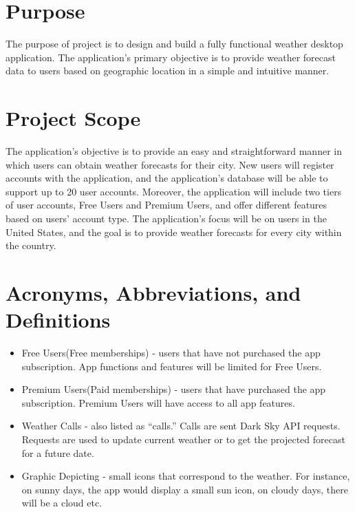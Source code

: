 \documentclass{scrreprt}
\begin{document}
\section{Purpose}
The purpose of project is to design and build a fully functional weather desktop application. The application’s primary objective is to provide weather forecast data to users based on geographic location in a simple and intuitive manner. 

\section{Project Scope}
The application’s objective is to provide an easy and straightforward manner in which users can obtain weather forecasts for their city. New users will register accounts with the application, and the application’s database will be able to support up to 20 user accounts.  Moreover, the application will include two tiers of user accounts, Free Users and Premium Users, and offer different features based on users’ account type. The application’s focus will be on users in the United States, and the goal is to provide weather forecasts for every city within the country.					
					
\section{Acronyms, Abbreviations, and Definitions}
\begin{itemize}

\item Free Users(Free memberships) - users that have not purchased the app subscription. App functions and features will be limited for Free Users.

\item Premium Users(Paid memberships) - users that have purchased the app subscription. Premium Users will have access to all app features. 

\item Weather Calls - also listed as “calls.” Calls are sent Dark Sky API requests. Requests are used to update current weather or to get the projected forecast for a future date.

\item Graphic Depicting - small icons that correspond to the weather. For instance, on sunny days, the app would display a small sun icon, on cloudy days, there will be a cloud etc.
				
\end{itemize}
\end{document}
